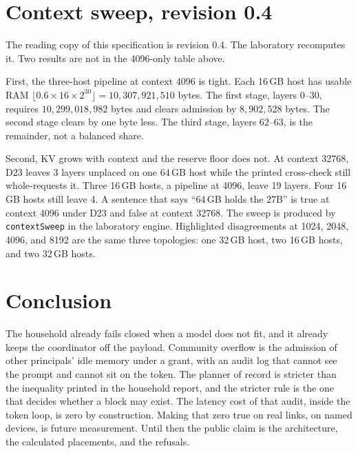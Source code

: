 \documentclass[11pt]{article}
\begin{document}
\section{Context sweep, revision 0.4}
The reading copy of this specification is revision 0.4. The laboratory recomputes it. Two results are not in the 4096-only table above.

First, the three-host pipeline at context 4096 is tight. Each 16\,GB host has usable RAM $\lfloor 0.6 \times 16 \times 2^{30}\rfloor = 10{,}307{,}921{,}510$ bytes. The first stage, layers 0--30, requires $10{,}299{,}018{,}982$ bytes and clears admission by $8{,}902{,}528$ bytes. The second stage clears by one byte less. The third stage, layers 62--63, is the remainder, not a balanced share.

Second, KV grows with context and the reserve floor does not. At context 32768, D23 leaves 3 layers unplaced on one 64\,GB host while the printed cross-check still whole-requests it. Three 16\,GB hosts, a pipeline at 4096, leave 19 layers. Four 16\,GB hosts still leave 4. A sentence that says ``64\,GB holds the 27B'' is true at context 4096 under D23 and false at context 32768. The sweep is produced by \texttt{contextSweep} in the laboratory engine. Highlighted disagreements at 1024, 2048, 4096, and 8192 are the same three topologies: one 32\,GB host, two 16\,GB hosts, and two 32\,GB hosts.

\section{Conclusion}
The household already fails closed when a model does not fit, and it already keeps the coordinator off the payload. Community overflow is the admission of other principals' idle memory under a grant, with an audit log that cannot see the prompt and cannot sit on the token. The planner of record is stricter than the inequality printed in the household report, and the stricter rule is the one that decides whether a block may exist. The latency cost of that audit, inside the token loop, is zero by construction. Making that zero true on real links, on named devices, is future measurement. Until then the public claim is the architecture, the calculated placements, and the refusals.
\end{document}
